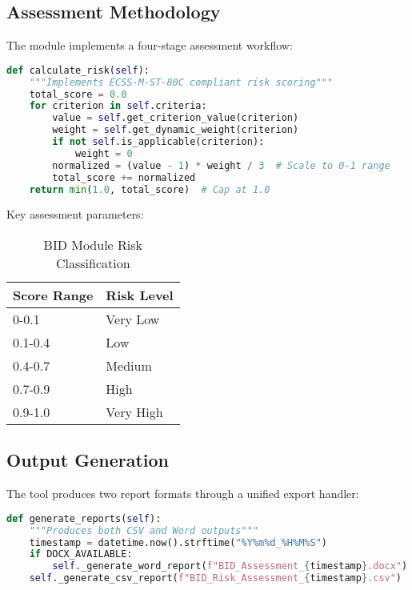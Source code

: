 \documentclass[binding=0.6cm]{sapthesis}
\begin{document}
\subsection{Assessment Methodology}

The module implements a four-stage assessment workflow:

\begin{lstlisting}[language=Python, caption=Core Assessment Algorithm]
def calculate_risk(self):
    """Implements ECSS-M-ST-80C compliant risk scoring"""
    total_score = 0.0
    for criterion in self.criteria:
        value = self.get_criterion_value(criterion)
        weight = self.get_dynamic_weight(criterion)
        if not self.is_applicable(criterion):
            weight = 0
        normalized = (value - 1) * weight / 3  # Scale to 0-1 range
        total_score += normalized
    return min(1.0, total_score)  # Cap at 1.0
\end{lstlisting}

Key assessment parameters:

\begin{table}[h]
\centering
\caption{BID Module Risk Classification}
\begin{tabular}{ll}
\hline
Score Range & Risk Level \\ \hline
0-0.1 & Very Low \\
0.1-0.4 & Low \\
0.4-0.7 & Medium \\
0.7-0.9 & High \\
0.9-1.0 & Very High \\ \hline
\end{tabular}
\end{table}

\subsection{Output Generation}

The tool produces two report formats through a unified export handler:

\begin{lstlisting}[language=Python, caption=Report Generation Logic]
def generate_reports(self):
    """Produces both CSV and Word outputs"""
    timestamp = datetime.now().strftime("%Y%m%d_%H%M%S")
    if DOCX_AVAILABLE:
        self._generate_word_report(f"BID_Assessment_{timestamp}.docx")
    self._generate_csv_report(f"BID_Risk_Assessment_{timestamp}.csv")
\end{lstlisting}
\end{document}
